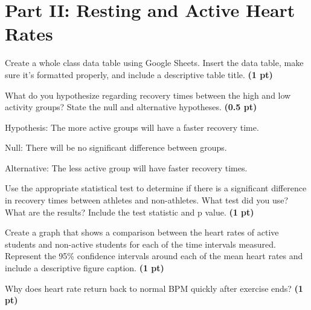 \documentclass[12pt,a4paper]{article}
\begin{document}
\section*{Part II: Resting and Active Heart Rates}
\begin{enumerate}[font=\bfseries, wide, resume]
    {\color{under}\item Create a whole class data table using Google Sheets. Insert the data table, make sure it’s formatted properly, and include a descriptive table title. \textbf{(1 pt)}}
    
    
    {\color{under}\item What do you hypothesize regarding recovery times between the high and low activity groups?  State the null and alternative hypotheses. \textbf{(0.5 pt)}}
    
    Hypothesis: The more active groups will have a faster recovery time. 

    Null: There will be no significant difference between groups. 

    Alternative: The less active group will have faster recovery times.
    
    {\color{under}\item  Use the appropriate statistical test to determine if there is a significant difference in recovery times between athletes and non-athletes.  What test did you use?  What are the results?  Include the test statistic and p value. \textbf{(1 pt)}}
    
    {\color{under}\item Create a graph that shows a comparison between the heart rates of active students and non-active students for each of the time intervals measured.  Represent the 95\% confidence intervals around each of the mean heart rates and include a descriptive figure caption. \textbf{(1 pt)}}

    {\color{under}\item Why does heart rate return back to normal BPM quickly after exercise ends? \textbf{(1 pt)}}
\end{enumerate}
    
\end{document}

